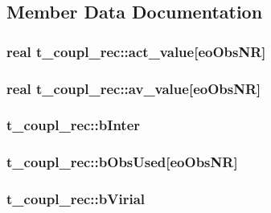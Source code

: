 \subsection{\-Member \-Data \-Documentation}
\hypertarget{structt__coupl__rec_a431fab669b976ddb6bfdc5a8d69748ca}{
\subsubsection[{act\-\_\-value}]{\setlength{\rightskip}{0pt plus 5cm}real {\bf t\-\_\-coupl\-\_\-rec\-::act\-\_\-value}\mbox{[}{\bf eo\-Obs\-N\-R}\mbox{]}}}\label{structt__coupl__rec_a431fab669b976ddb6bfdc5a8d69748ca}
\hypertarget{structt__coupl__rec_ab66a891fae795a31ae3ed59e0a991f48}{
\subsubsection[{av\-\_\-value}]{\setlength{\rightskip}{0pt plus 5cm}real {\bf t\-\_\-coupl\-\_\-rec\-::av\-\_\-value}\mbox{[}{\bf eo\-Obs\-N\-R}\mbox{]}}}\label{structt__coupl__rec_ab66a891fae795a31ae3ed59e0a991f48}
\hypertarget{structt__coupl__rec_a0fc3c16fcb081262d131d3ecf19454d4}{
\subsubsection[{b\-Inter}]{ {\bf t\-\_\-coupl\-\_\-rec\-::b\-Inter}}}\label{structt__coupl__rec_a0fc3c16fcb081262d131d3ecf19454d4}
\hypertarget{structt__coupl__rec_a1b3547e413ac43b06dee274022b4f8e1}{
\subsubsection[{b\-Obs\-Used}]{ {\bf t\-\_\-coupl\-\_\-rec\-::b\-Obs\-Used}\mbox{[}{\bf eo\-Obs\-N\-R}\mbox{]}}}\label{structt__coupl__rec_a1b3547e413ac43b06dee274022b4f8e1}
\hypertarget{structt__coupl__rec_a12b98f0dce82eb94e42860bdb7cce4c9}{
\subsubsection[{b\-Virial}]{ {\bf t\-\_\-coupl\-\_\-rec\-::b\-Virial}}}\label{structt__coupl__rec_a12b98f0dce82eb94e42860bdb7cce4c9}
